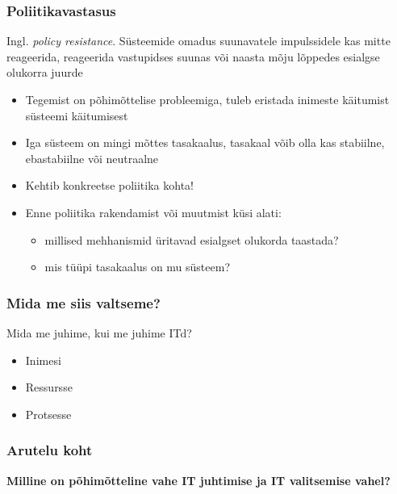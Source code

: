 \begin{frame}[fragile]
  \frametitle{Poliitikavastasus}
 Ingl. \emph{policy resistance}. Süsteemide omadus suunavatele impulssidele kas mitte reageerida, reageerida vastupidses suunas või naasta mõju lõppedes esialgse olukorra juurde
	\begin{itemize}
		\item Tegemist on põhimõttelise probleemiga, tuleb eristada inimeste käitumist süsteemi käitumisest
		\item Iga süsteem on mingi mõttes tasakaalus, tasakaal võib olla kas stabiilne, ebastabiilne või neutraalne
		\item Kehtib konkreetse poliitika kohta!
		\item Enne poliitika rakendamist või muutmist küsi alati: 
		\begin{itemize}
			\item millised mehhanismid üritavad esialgset olukorda taastada? 
			\item mis tüüpi tasakaalus on mu süsteem?
	\end{itemize}

	\end{itemize}
\end{frame}

\begin{frame}[fragile]
  \frametitle{Mida me siis valtseme?}
	Mida me juhime, kui me juhime ITd?
	\begin{itemize}
		\item Inimesi
		\item Ressursse
		\item Protsesse
	\end{itemize}
\end{frame}


\begin{frame}[fragile]
  \frametitle{Arutelu koht}
		\begin{center}
			\textbf{Milline on põhimõtteline vahe IT juhtimise ja IT valitsemise vahel?}
		\end{center}
\end{frame}


